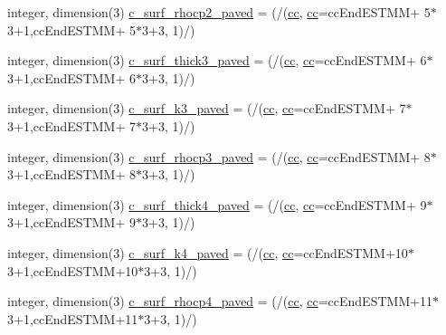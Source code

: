 \begin{DoxyCompactItemize}
\item 
integer, dimension(3) \hyperlink{namespaceallocatearray_a20107aaba9ae2f761b47e50002d54c19}{c\+\_\+surf\+\_\+rhocp2\+\_\+paved} = (/(\hyperlink{namespaceallocatearray_ac863c81704eb507dee10f5e10741e10c}{cc}, \hyperlink{namespaceallocatearray_ac863c81704eb507dee10f5e10741e10c}{cc}=cc\+End\+E\+S\+T\+MM+ 5$\ast$3+1,cc\+End\+E\+S\+T\+MM+ 5$\ast$3+3, 1)/)
\item 
integer, dimension(3) \hyperlink{namespaceallocatearray_adc3c9e44723c88e7ec4732af652dd5eb}{c\+\_\+surf\+\_\+thick3\+\_\+paved} = (/(\hyperlink{namespaceallocatearray_ac863c81704eb507dee10f5e10741e10c}{cc}, \hyperlink{namespaceallocatearray_ac863c81704eb507dee10f5e10741e10c}{cc}=cc\+End\+E\+S\+T\+MM+ 6$\ast$3+1,cc\+End\+E\+S\+T\+MM+ 6$\ast$3+3, 1)/)
\item 
integer, dimension(3) \hyperlink{namespaceallocatearray_acf3af91d0a1eb59078343da9f4395d34}{c\+\_\+surf\+\_\+k3\+\_\+paved} = (/(\hyperlink{namespaceallocatearray_ac863c81704eb507dee10f5e10741e10c}{cc}, \hyperlink{namespaceallocatearray_ac863c81704eb507dee10f5e10741e10c}{cc}=cc\+End\+E\+S\+T\+MM+ 7$\ast$3+1,cc\+End\+E\+S\+T\+MM+ 7$\ast$3+3, 1)/)
\item 
integer, dimension(3) \hyperlink{namespaceallocatearray_ac9b0852b6692a5ef0caef755e260fa5a}{c\+\_\+surf\+\_\+rhocp3\+\_\+paved} = (/(\hyperlink{namespaceallocatearray_ac863c81704eb507dee10f5e10741e10c}{cc}, \hyperlink{namespaceallocatearray_ac863c81704eb507dee10f5e10741e10c}{cc}=cc\+End\+E\+S\+T\+MM+ 8$\ast$3+1,cc\+End\+E\+S\+T\+MM+ 8$\ast$3+3, 1)/)
\item 
integer, dimension(3) \hyperlink{namespaceallocatearray_aa58317ae249f058a9b33be35a803a68e}{c\+\_\+surf\+\_\+thick4\+\_\+paved} = (/(\hyperlink{namespaceallocatearray_ac863c81704eb507dee10f5e10741e10c}{cc}, \hyperlink{namespaceallocatearray_ac863c81704eb507dee10f5e10741e10c}{cc}=cc\+End\+E\+S\+T\+MM+ 9$\ast$3+1,cc\+End\+E\+S\+T\+MM+ 9$\ast$3+3, 1)/)
\item 
integer, dimension(3) \hyperlink{namespaceallocatearray_a43ae20538128d75655c3b8dd31374e0c}{c\+\_\+surf\+\_\+k4\+\_\+paved} = (/(\hyperlink{namespaceallocatearray_ac863c81704eb507dee10f5e10741e10c}{cc}, \hyperlink{namespaceallocatearray_ac863c81704eb507dee10f5e10741e10c}{cc}=cc\+End\+E\+S\+T\+MM+10$\ast$3+1,cc\+End\+E\+S\+T\+MM+10$\ast$3+3, 1)/)
\item 
integer, dimension(3) \hyperlink{namespaceallocatearray_a77b35184224cfedd443821142679b770}{c\+\_\+surf\+\_\+rhocp4\+\_\+paved} = (/(\hyperlink{namespaceallocatearray_ac863c81704eb507dee10f5e10741e10c}{cc}, \hyperlink{namespaceallocatearray_ac863c81704eb507dee10f5e10741e10c}{cc}=cc\+End\+E\+S\+T\+MM+11$\ast$3+1,cc\+End\+E\+S\+T\+MM+11$\ast$3+3, 1)/)

\end{DoxyCompactItemize}

